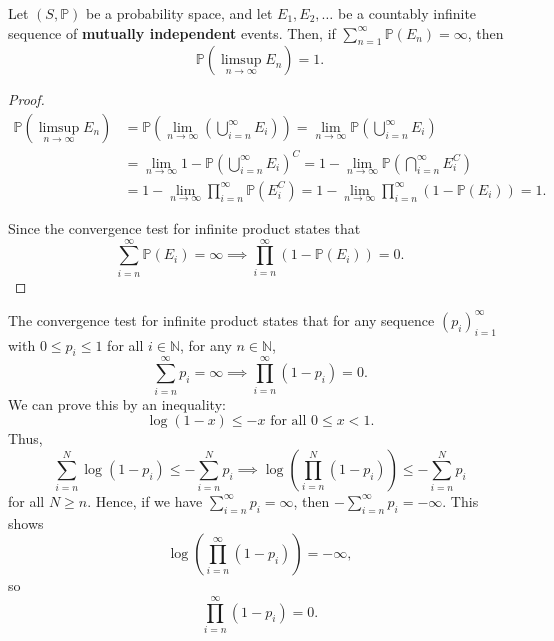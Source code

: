 \begin{theorem}
    Let \((S, \mathbb{P} )\) be a probability space, and let \(E_1, E_2, \dots \) be a countably infinite sequence of \textbf{mutually independent} events. Then, if \(\sum_{n=1}^{\infty} \mathbb{P} (E_n) = \infty \), then 
    \[
        \mathbb{P} (\limsup_{n \to \infty} E_n ) = 1.
    \]   
\end{theorem}

\begin{proof}
    \begin{align*}
        \mathbb{P} (\limsup_{n \to \infty} E_n )&= \mathbb{P} \left( \lim_{n \to \infty}  \left( \bigcup_{i=n}^{\infty} E_i \right) \right) = \lim_{n \to \infty} \mathbb{P} \left( \bigcup_{i=n}^{\infty} E_i  \right) \\
        &= \lim_{n \to \infty} 1 - \mathbb{P} \left( \bigcup_{i=n}^{\infty} E_i  \right)^C = 1 - \lim_{n \to \infty} \mathbb{P} \left( \bigcap_{i=n}^{\infty} E_i^C  \right) \\
        &= 1 - \lim_{n \to \infty} \prod _{i = n}^{\infty} \mathbb{P} (E_i^C) = 1 - \lim_{n \to \infty} \prod _{i = n}^{\infty} (1 - \mathbb{P} (E_i)) = 1.       
    \end{align*}

    Since the convergence test for infinite product states that 
    \[
        \sum_{i=n}^{\infty} \mathbb{P} (E_i) = \infty \implies \prod _{i=n}^{\infty} (1 - \mathbb{P} (E_i)) = 0. 
    \]
\end{proof}

\begin{remark}
    The convergence test for infinite product states that for any sequence \((p_i)_{i=1}^{\infty} \) with \(0 \le p_i \le 1\) for all \(i \in \mathbb{N} \), for any \(n \in \mathbb{N} \), 
    \[
        \sum_{i=n}^{\infty} p_i = \infty \implies \prod _{i=n}^{\infty} (1 - p_i) = 0. 
    \]  
    We can prove this by an inequality:
    \[
        \log (1 - x) \le -x \text{ for all } 0 \le x < 1. 
    \]
    Thus,
    \[
        \sum_{i=n}^{N} \log (1 - p_i) \le - \sum_{i=n}^N p_i \implies \log \left( \prod _{i=n}^N (1 - p_i) \right) \le -\sum_{i=n}^N p_i   
    \]
    for all \(N \ge n\). Hence, if we have \(\sum_{i=n}^{\infty} p_i = \infty  \), then \(-\sum_{i=n}^{\infty} p_i = -\infty  \). This shows 
    \[
        \log \left( \prod _{i=n}^{\infty} (1 - p_i) \right) = -\infty, 
    \]   
    so 
    \[
        \prod _{i=n}^{\infty} (1 - p_i) = 0.
    \]
\end{remark}

